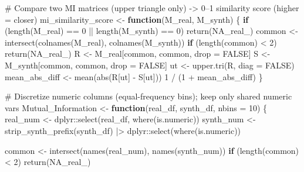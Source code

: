 \documentclass[
  letterpaper,
  DIV=11,
  numbers=noendperiod]{scrartcl}
\newenvironment{Shaded}{\begin{snugshade}}{\end{snugshade}}
\newcommand{\AttributeTok}[1]{\textcolor[rgb]{0.40,0.45,0.13}{#1}}
\newcommand{\CommentTok}[1]{\textcolor[rgb]{0.37,0.37,0.37}{#1}}
\newcommand{\ConstantTok}[1]{\textcolor[rgb]{0.56,0.35,0.01}{#1}}
\newcommand{\ControlFlowTok}[1]{\textcolor[rgb]{0.00,0.23,0.31}{\textbf{#1}}}
\newcommand{\DecValTok}[1]{\textcolor[rgb]{0.68,0.00,0.00}{#1}}
\newcommand{\FunctionTok}[1]{\textcolor[rgb]{0.28,0.35,0.67}{#1}}
\newcommand{\NormalTok}[1]{\textcolor[rgb]{0.00,0.23,0.31}{#1}}
\newcommand{\OtherTok}[1]{\textcolor[rgb]{0.00,0.23,0.31}{#1}}
\newcommand{\SpecialCharTok}[1]{\textcolor[rgb]{0.37,0.37,0.37}{#1}}
\begin{document}
\begin{Shaded}
\begin{Highlighting}[]
\CommentTok{\# Compare two MI matrices (upper triangle only) {-}\textgreater{} 0–1 similarity score (higher = closer)}
\NormalTok{mi\_similarity\_score }\OtherTok{\textless{}{-}} \ControlFlowTok{function}\NormalTok{(M\_real, M\_synth) \{}
  \ControlFlowTok{if}\NormalTok{ (}\FunctionTok{length}\NormalTok{(M\_real) }\SpecialCharTok{==} \DecValTok{0} \SpecialCharTok{||} \FunctionTok{length}\NormalTok{(M\_synth) }\SpecialCharTok{==} \DecValTok{0}\NormalTok{) }\FunctionTok{return}\NormalTok{(}\ConstantTok{NA\_real\_}\NormalTok{)}
\NormalTok{  common }\OtherTok{\textless{}{-}} \FunctionTok{intersect}\NormalTok{(}\FunctionTok{colnames}\NormalTok{(M\_real), }\FunctionTok{colnames}\NormalTok{(M\_synth))}
  \ControlFlowTok{if}\NormalTok{ (}\FunctionTok{length}\NormalTok{(common) }\SpecialCharTok{\textless{}} \DecValTok{2}\NormalTok{) }\FunctionTok{return}\NormalTok{(}\ConstantTok{NA\_real\_}\NormalTok{)}
\NormalTok{  R }\OtherTok{\textless{}{-}}\NormalTok{ M\_real[common, common, drop }\OtherTok{=} \ConstantTok{FALSE}\NormalTok{]}
\NormalTok{  S }\OtherTok{\textless{}{-}}\NormalTok{ M\_synth[common, common, drop }\OtherTok{=} \ConstantTok{FALSE}\NormalTok{]}
\NormalTok{  ut }\OtherTok{\textless{}{-}} \FunctionTok{upper.tri}\NormalTok{(R, }\AttributeTok{diag =} \ConstantTok{FALSE}\NormalTok{)}
\NormalTok{  mean\_abs\_diff }\OtherTok{\textless{}{-}} \FunctionTok{mean}\NormalTok{(}\FunctionTok{abs}\NormalTok{(R[ut] }\SpecialCharTok{{-}}\NormalTok{ S[ut]))}
  \DecValTok{1} \SpecialCharTok{/}\NormalTok{ (}\DecValTok{1} \SpecialCharTok{+}\NormalTok{ mean\_abs\_diff)}
\NormalTok{\}}

\CommentTok{\# Discretize numeric columns (equal{-}frequency bins); keep only shared numeric vars}
\NormalTok{Mutual\_Information }\OtherTok{\textless{}{-}} \ControlFlowTok{function}\NormalTok{(real\_df, synth\_df, }\AttributeTok{nbins =} \DecValTok{10}\NormalTok{) \{}
\NormalTok{  real\_num  }\OtherTok{\textless{}{-}}\NormalTok{ dplyr}\SpecialCharTok{::}\FunctionTok{select}\NormalTok{(real\_df,  }\FunctionTok{where}\NormalTok{(is.numeric))}
\NormalTok{  synth\_num }\OtherTok{\textless{}{-}} \FunctionTok{strip\_synth\_prefix}\NormalTok{(synth\_df) }\SpecialCharTok{|\textgreater{}}\NormalTok{ dplyr}\SpecialCharTok{::}\FunctionTok{select}\NormalTok{(}\FunctionTok{where}\NormalTok{(is.numeric))}

\NormalTok{  common }\OtherTok{\textless{}{-}} \FunctionTok{intersect}\NormalTok{(}\FunctionTok{names}\NormalTok{(real\_num), }\FunctionTok{names}\NormalTok{(synth\_num))}
  \ControlFlowTok{if}\NormalTok{ (}\FunctionTok{length}\NormalTok{(common) }\SpecialCharTok{\textless{}} \DecValTok{2}\NormalTok{) }\FunctionTok{return}\NormalTok{(}\ConstantTok{NA\_real\_}\NormalTok{)}


\end{Highlighting}
\end{Shaded}
\end{document}
